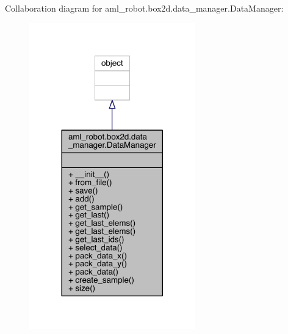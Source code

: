 Collaboration diagram for aml\+\_\+robot.\+box2d.\+data\+\_\+manager.\+Data\+Manager\+:
\nopagebreak
\begin{figure}[H]
\begin{center}
\leavevmode
\includegraphics[width=204pt]{classaml__robot_1_1box2d_1_1data__manager_1_1_data_manager__coll__graph}
\end{center}
\end{figure}
